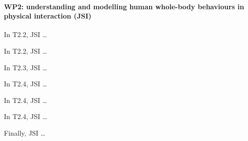 






 
\paragraph*{WP2: understanding and modelling human whole-body behaviours in physical interaction (JSI)}
In T2.2, JSI \dots 

In T2.2, JSI \dots 

In T2.3, JSI \dots 

In T2.4, JSI \dots 

In T2.4, JSI \dots 

In T2.4, JSI \dots 

Finally, JSI \dots 
